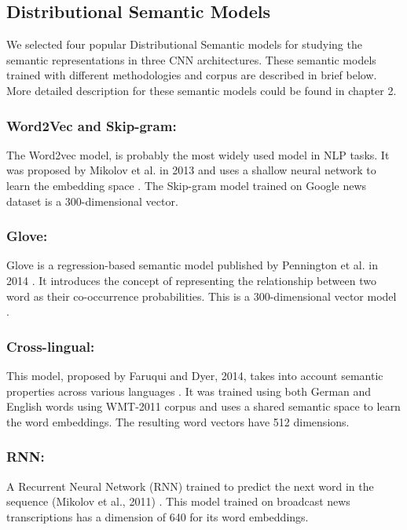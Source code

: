 \subsection{Distributional Semantic Models}
\label{dsm}

We selected four popular Distributional Semantic models for studying the semantic representations in three CNN architectures. These semantic models trained with different methodologies and corpus are described in brief below. More detailed description for these semantic models could be found in chapter 2.

\subsubsection{Word2Vec and Skip-gram:} The Word2vec model, is probably the most widely
used model in NLP tasks. It was proposed by Mikolov et al. in
2013 and uses a shallow neural network to learn the embedding
space \cite{Word2Vec}. The Skip-gram model trained on Google
news dataset is a 300-dimensional vector.


\subsubsection{Glove:} 
Glove is a regression-based semantic model published by Pennington et al. in 2014 \cite{Glove}. It introduces the concept of representing the relationship between two word as their co-occurrence probabilities. This is a 300-dimensional vector model .

\subsubsection{Cross-lingual:} This model, proposed by Faruqui
and Dyer, 2014, takes into account semantic properties across various languages \cite{Crosslingual}. It was trained using both German and English words using WMT-2011 corpus and uses a shared semantic space to learn the word embeddings. The resulting word vectors
have 512 dimensions.

\subsubsection{RNN:} A Recurrent Neural Network (RNN) trained to predict the next word in the sequence (Mikolov et
al., 2011) \cite{RNN}. This model trained on broadcast news transcriptions has a dimension of 640 for its word embeddings.



